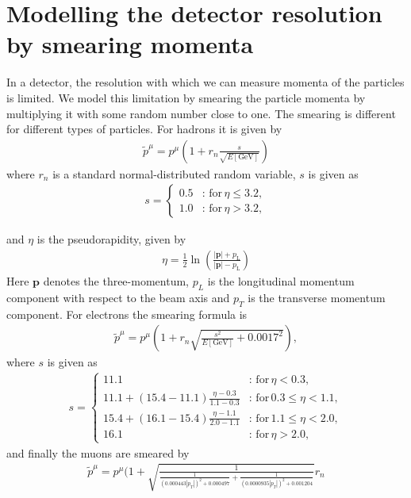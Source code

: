 \documentclass[twoside,english]{uiofysmaster}
\begin{document}
\section{Modelling the detector resolution by smearing momenta}
In a detector, the resolution with which we can measure momenta of the particles is limited. We model this limitation by smearing the particle momenta by multiplying it with some random number close to one. The smearing is different for different types of particles. For hadrons it is given by
\begin{align}
	\tilde{p}^\mu = p^\mu \left( 1 + r_n \frac{s}{\sqrt{E \mathrm{[GeV]}}} \right) \label{eq:smear1}
\end{align}
where $r_n$ is a standard normal-distributed random variable, $s$ is given as
\begin{align}
	s = \begin{cases}
								0.5 &: \,\mathrm{for }\, \eta \leq 3.2,\\
								1.0 &: \,\mathrm{for }\, \eta > 3.2,
		\end{cases}
\end{align}

and $\eta$ is the pseudorapidity, given by
\begin{align}
	\eta = \frac{1}{2} \ln \left(\frac{\left|\mathbf{p}\right|+p_\text{L}}{\left|\mathbf{p}\right|-p_\text{L}}\right)
\end{align}
Here $\mathbf{p}$ denotes the three-momentum, $p_L$ is the longitudinal momentum component with respect to the beam axis and $p_T$ is the transverse momentum component. For electrons the smearing formula is
\begin{align}
	\tilde{p}^\mu = p^\mu \left(1 + r_n \sqrt{\frac{s^2}{E\mathrm{[GeV]}} + 0.0017^2}\right),
\end{align}
where $s$ is given as
\begin{align}
	s = \begin{cases}
					11.1 												&: \,\mathrm{for}\, \eta < 0.3,\\
					11.1 + (15.4 - 11.1)\frac{\eta - 0.3}{1.1 - 0.3} 	&: \,\mathrm{for}\, 0.3 \leq \eta < 1.1,\\
					15.4 + (16.1 - 15.4)\frac{\eta - 1.1}{2.0 - 1.1}		&: \,\mathrm{for}\, 1.1 \leq \eta < 2.0,\\
					16.1 												&: \,\mathrm{for}\, \eta > 2.0,
	\end{cases}
\end{align}
and finally the muons are smeared by
\begin{align}
	\tilde p^\mu = p^\mu (1 + \sqrt{\frac{1}{\frac{1}{(0.000443|p_T|)^2 + 0.000497} + 
        \frac{1}{(0.0000935|p_T|)^2 + 0.001204}}} r_n
\end{align}
\end{document}
